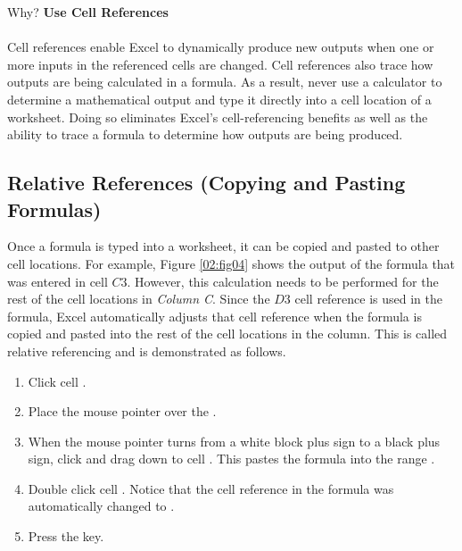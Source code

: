 \begin{center}
	\begin{infobox}{Why?}
		\textbf{Use Cell References}
		\\
		\\
		Cell references enable Excel to dynamically produce new outputs when one or more inputs in the referenced cells are changed. Cell references also trace how outputs are being calculated in a formula. As a result, never use a calculator to determine a mathematical output and type it directly into a cell location of a worksheet. Doing so eliminates Excel's cell-referencing benefits as well as the ability to trace a formula to determine how outputs are being produced.
	\end{infobox}
\end{center}

\subsection{Relative References (Copying and Pasting Formulas)}

Once a formula is typed into a worksheet, it can be copied and pasted to other cell locations. For example, Figure \ref{02:fig04} shows the output of the formula that was entered in cell $ C3 $. However, this calculation needs to be performed for the rest of the cell locations in \textit{Column C}. Since the $ D3 $ cell reference is used in the formula, Excel automatically adjusts that cell reference when the formula is copied and pasted into the rest of the cell locations in the column. This is called relative referencing and is demonstrated as follows.

\begin{enumbox}
	\begin{enumerate}
		\item Click cell .
		\item Place the mouse pointer over the .
		\item When the mouse pointer turns from a white block plus sign to a black plus sign, click and drag down to cell . This pastes the formula into the range .
		\item Double click cell . Notice that the cell reference in the formula was automatically changed to .
		\item Press the  key.
	\end{enumerate}
\end{enumbox}

